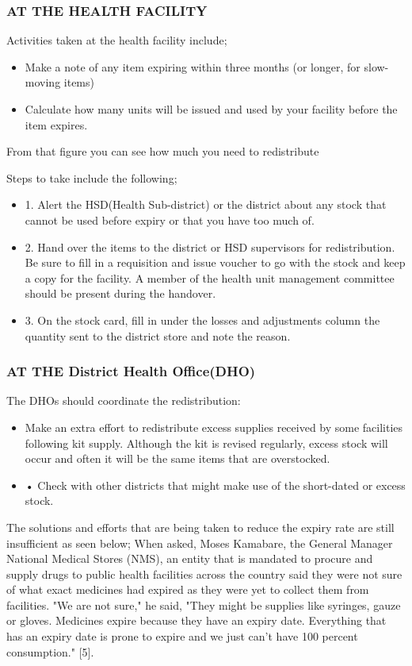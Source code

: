 \documentclass[12pt, a4paper]{report}
\begin{document}
\subsubsection*{AT THE HEALTH FACILITY}  
Activities taken at the health facility include; 
\begin{itemize}
\item Make a note of any item expiring within three months (or longer, for slow-moving items) 
\item Calculate how many units will be issued and used by your facility before the item expires. 
\end{itemize}
From that figure you can see how much you need to redistribute  

Steps to take include the following;  
\begin{itemize}
\item{1. Alert the HSD(Health Sub-district) or the district about any stock that cannot be used before expiry or that you have too much of.}
\item{ 2. Hand over the items to the district or HSD supervisors for redistribution.} 
Be sure to fill in a requisition and issue voucher to go with the stock and keep a copy for the facility. 
A member of the health unit management committee should be present during the handover. 
\item{3. On the stock card, fill in under the losses and adjustments column the quantity sent to the district store and note the reason.}  
\end{itemize}

\subsubsection*{AT THE District Health Office(DHO)}

The DHOs should coordinate the redistribution:
\begin{itemize}
\item Make an extra effort to redistribute excess supplies received by some facilities following kit supply. Although the kit is revised regularly, excess stock will occur and often it will be the same items that are overstocked.  
\item • Check with other districts that might make use of the short-dated or excess stock. 
\end{itemize}

The solutions and efforts that are being taken to reduce the expiry rate are still insufficient as seen below; 
When asked, Moses Kamabare, the General Manager National Medical Stores (NMS), an entity that is mandated to procure and supply drugs to public health facilities across the country said they were not sure of what exact medicines had expired as they were yet to collect them from facilities. "We are not sure," he said, "They might be supplies like syringes, gauze or gloves. Medicines expire because they have an expiry date. Everything that has an expiry date is prone to expire and we just can't have 100 percent consumption." [5]. 
\end{document}
